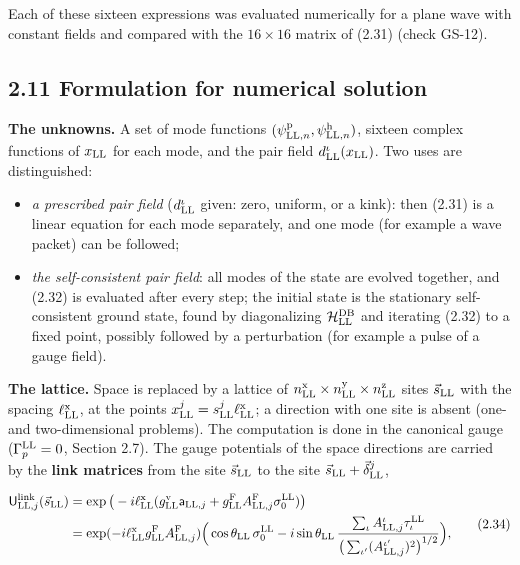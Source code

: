 \documentclass[
  10pt,
]{article}
\providecommand{\tightlist}{%
  \setlength{\itemsep}{0pt}\setlength{\parskip}{0pt}}
\begin{document}
Each of these sixteen expressions was evaluated numerically for a plane
wave with constant fields and compared with the \(16\times16\) matrix of
(2.31) (check GS-12).

\hypertarget{formulation-for-numerical-solution}{%
\subsection{2.11 Formulation for numerical
solution}\label{formulation-for-numerical-solution}}

\textbf{The unknowns.} A set of mode functions
\((\psi^{\rm p}_{{\rm LL},n},\psi^{\rm h}_{{\rm LL},n})\), sixteen
complex functions of \(x_{\rm LL}\) for each mode, and the pair field
\(d^\iota_{\rm LL}(x_{\rm LL})\). Two uses are distinguished:

\begin{itemize}
\tightlist
\item
  \emph{a prescribed pair field} (\(d^\iota_{\rm LL}\) given: zero,
  uniform, or a kink): then (2.31) is a linear equation for each mode
  separately, and one mode (for example a wave packet) can be followed;
\item
  \emph{the self-consistent pair field}: all modes of the state are
  evolved together, and (2.32) is evaluated after every step; the
  initial state is the stationary self-consistent ground state, found by
  diagonalizing \(\mathcal H^{\rm DB}_{\rm LL}\) and iterating (2.32) to
  a fixed point, possibly followed by a perturbation (for example a
  pulse of a gauge field).
\end{itemize}

\textbf{The lattice.} Space is replaced by a lattice of
\(n^{\rm x}_{\rm LL}\times n^{\rm y}_{\rm LL}\times n^{\rm z}_{\rm LL}\)
sites \(\vec s_{\rm LL}\) with the spacing \(\ell^{\rm x}_{\rm LL}\), at
the points \(x^j_{\rm LL}=s^j_{\rm LL}\ell^{\rm x}_{\rm LL}\); a
direction with one site is absent (one- and two-dimensional problems).
The computation is done in the canonical gauge (\(\Gamma^{\rm LL}_p=0\),
Section 2.7). The gauge potentials of the space directions are carried
by the \textbf{link matrices} from the site \(\vec s_{\rm LL}\) to the
site \(\vec s_{\rm LL}+\vec\delta^j_{\rm LL}\),

\[\begin{aligned}\mathsf U^{\rm link}_{{\rm LL},j}(\vec s_{\rm LL})&=\exp\big(-i\ell^{\rm x}_{\rm LL}(g^{\rm v}_{\rm LL}\mathsf a_{{\rm LL},j}+g^{\rm F}_{\rm LL}A^{\rm F}_{{\rm LL},j}\sigma^{\rm LL}_0)\big)\\&=\exp(-i\ell^{\rm x}_{\rm LL}g^{\rm F}_{\rm LL}A^{\rm F}_{{\rm LL},j})\Big(\cos\theta_{\rm LL}\,\sigma^{\rm LL}_0-i\sin\theta_{\rm LL}\,\frac{\sum_\iota A^\iota_{{\rm LL},j}\tau^{\rm LL}_\iota}{\big(\sum_{\iota'}(A^{\iota'}_{{\rm LL},j})^2\big)^{1/2}}\Big),\end{aligned}\tag{2.34}\]
\end{document}
